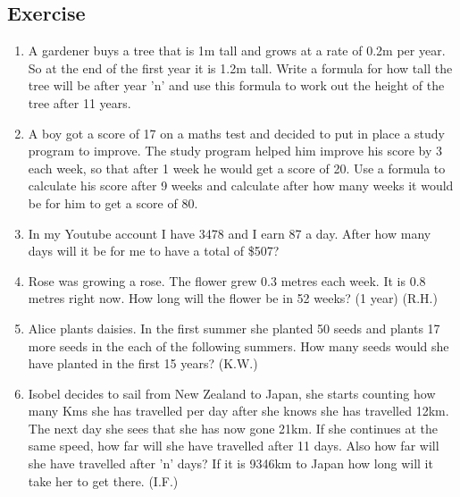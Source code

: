 \subsection{Exercise}
\begin{enumerate}
	\item A gardener buys a tree that is 1m tall and grows at a rate of 0.2m per year.  So at the end of the first year it is 1.2m tall.  Write a formula for how tall the tree will be after year 'n' and use this formula to work out the height of the tree after 11 years.
	\item A boy got a score of 17 on a maths test and decided to put in place a study program to improve.  The study program helped him improve his score by 3 each week, so that after 1 week he would get a score of 20.  Use a formula to calculate his score after 9 weeks and calculate after how many weeks it would be for him to get a score of 80.
	\item In my Youtube account I have 3478\cent \hspace{0.2cm} and I earn 87\cent \hspace{0.2cm} a day.  After how many days will it be for me to have a total of \$507?
	\item Rose was growing a rose. The flower grew 0.3 metres each week. It is 0.8 metres right now. How long will the flower be in 52 weeks? (1 year) (R.H.)
	\item Alice plants daisies.  In the first summer she planted 50 seeds and plants 17 more seeds in the each of the following summers.  How many seeds would she have planted in the first 15 years? (K.W.)
	\item Isobel decides to sail from New Zealand to Japan, she starts counting how many Kms she has travelled per day after she knows she has travelled 12km.  The next day she sees that she has now gone 21km.  If she continues at the same speed, how far will she have travelled after 11 days.  Also how far will she have travelled after 'n' days?  If it is 9346km to Japan how long will it take her to get there. (I.F.)
\end{enumerate}
